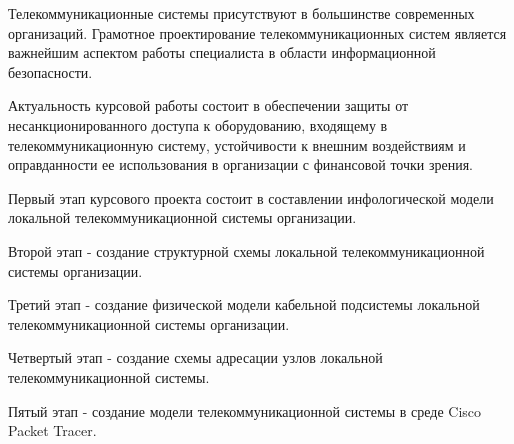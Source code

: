 Телекоммуникационные системы  присутствуют в большинстве современных организаций. Грамотное проектирование телекоммуникационных систем является важнейшим  аспектом работы специалиста в области информационной безопасности. 

Актуальность курсовой работы состоит в обеспечении защиты от несанкционированного доступа к оборудованию, входящему в телекоммуникационную систему, устойчивости к внешним воздействиям и оправданности ее использования в организации с финансовой точки зрения.

Первый этап курсового проекта состоит в составлении инфологической модели локальной телекоммуникационной системы организации.

Второй этап \hyp{} создание структурной схемы локальной телекоммуникационной системы организации.

Третий этап \hyp{} создание физической модели кабельной подсистемы локальной телекоммуникационной системы организации.

Четвертый этап \hyp{} создание схемы адресации узлов локальной телекоммуникационной системы.

Пятый этап \hyp{} создание модели телекоммуникационной системы в среде Cisco Packet Tracer.